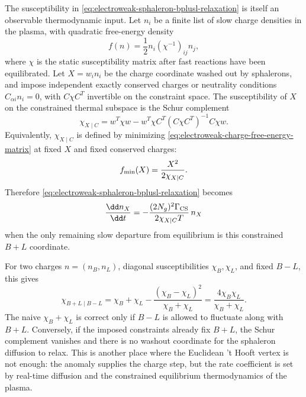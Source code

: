 \begin{controlledapproximation}
\label{ca:electroweak-constrained-washout-susceptibility}
The susceptibility in
\eqref{eq:electroweak-sphaleron-bplusl-relaxation} is itself an observable
thermodynamic input.  Let \(n_i\) be a finite list of slow charge densities in
the plasma, with quadratic free-energy density
\begin{equation}
  f(n)=\frac12 n_i(\chi^{-1})_{ij}n_j,
  \label{eq:electroweak-charge-free-energy-matrix}
\end{equation}
where \(\chi\) is the static susceptibility matrix after fast reactions have
been equilibrated.  Let \(X=w_i n_i\) be the charge coordinate washed out by
sphalerons, and impose independent exactly conserved charges or neutrality
conditions \(C_{\alpha i}n_i=0\), with \(C\chi C^T\) invertible on the
constraint space.  The susceptibility of \(X\) on the constrained thermal
subspace is the Schur complement
\begin{equation}
  \chi_{X\mid C}
  =
  w^T\chi w
  -
  w^T\chi C^T
  (C\chi C^T)^{-1}
  C\chi w .
  \label{eq:electroweak-constrained-susceptibility}
\end{equation}
Equivalently, \(\chi_{X\mid C}\) is defined by minimizing
\eqref{eq:electroweak-charge-free-energy-matrix} at fixed \(X\) and fixed
conserved charges:
\[
  f_{\rm min}(X)=\frac{X^2}{2\chi_{X\mid C}}.
\]
Therefore
\eqref{eq:electroweak-sphaleron-bplusl-relaxation} becomes
\[
  \frac{\dd n_X}{\dd t}
  =
  -
  \frac{(2N_g)^2\Gamma_{\rm CS}}{2\chi_{X\mid C}T}\,n_X
\]
when the only remaining slow departure from equilibrium is this constrained
\(B+L\) coordinate.

For two charges \(n=(n_B,n_L)\), diagonal susceptibilities
\(\chi_B,\chi_L\), and fixed \(B-L\), this gives
\begin{equation}
  \chi_{B+L\mid B-L}
  =
  \chi_B+\chi_L
  -
  \frac{(\chi_B-\chi_L)^2}{\chi_B+\chi_L}
  =
  \frac{4\chi_B\chi_L}{\chi_B+\chi_L}.
  \label{eq:electroweak-bl-projected-susceptibility}
\end{equation}
The naive \(\chi_B+\chi_L\) is correct only if \(B-L\) is allowed to fluctuate
along with \(B+L\).  Conversely, if the imposed constraints already fix
\(B+L\), the Schur complement vanishes and there is no washout coordinate for
the sphaleron diffusion to relax.  This is another place where the Euclidean
't Hooft vertex is not enough: the anomaly supplies the charge step, but the
rate coefficient is set by real-time diffusion and the constrained equilibrium
thermodynamics of the plasma.
\end{controlledapproximation}

